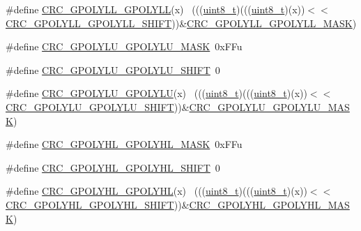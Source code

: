 \begin{DoxyCompactItemize}
\item 
\#define \hyperlink{group___c_r_c___register___masks_ga2ee0f77533aefa75692a541b5eac2a1b}{C\+R\+C\+\_\+\+G\+P\+O\+L\+Y\+L\+L\+\_\+\+G\+P\+O\+L\+Y\+LL}(x)                                  ~(((\hyperlink{_p_e___types_8h_aba7bc1797add20fe3efdf37ced1182c5}{uint8\+\_\+t})(((\hyperlink{_p_e___types_8h_aba7bc1797add20fe3efdf37ced1182c5}{uint8\+\_\+t})(x))$<$$<$\hyperlink{group___c_r_c___register___masks_ga1a323693acd9a37bb90abdc7f16ebbd8}{C\+R\+C\+\_\+\+G\+P\+O\+L\+Y\+L\+L\+\_\+\+G\+P\+O\+L\+Y\+L\+L\+\_\+\+S\+H\+I\+FT}))\&\hyperlink{group___c_r_c___register___masks_ga659c987f1e9d74e32d16e4b69bd763ee}{C\+R\+C\+\_\+\+G\+P\+O\+L\+Y\+L\+L\+\_\+\+G\+P\+O\+L\+Y\+L\+L\+\_\+\+M\+A\+SK})
\item 
\#define \hyperlink{group___c_r_c___register___masks_gaf2e9b900f7d964512e1541299729abb9}{C\+R\+C\+\_\+\+G\+P\+O\+L\+Y\+L\+U\+\_\+\+G\+P\+O\+L\+Y\+L\+U\+\_\+\+M\+A\+SK}~0x\+F\+Fu
\item 
\#define \hyperlink{group___c_r_c___register___masks_ga4d6303422fb112dfad558ee2f84aa92c}{C\+R\+C\+\_\+\+G\+P\+O\+L\+Y\+L\+U\+\_\+\+G\+P\+O\+L\+Y\+L\+U\+\_\+\+S\+H\+I\+FT}~0
\item 
\#define \hyperlink{group___c_r_c___register___masks_gae056d7d15c0caa312e768f34d89085bb}{C\+R\+C\+\_\+\+G\+P\+O\+L\+Y\+L\+U\+\_\+\+G\+P\+O\+L\+Y\+LU}(x)                                  ~(((\hyperlink{_p_e___types_8h_aba7bc1797add20fe3efdf37ced1182c5}{uint8\+\_\+t})(((\hyperlink{_p_e___types_8h_aba7bc1797add20fe3efdf37ced1182c5}{uint8\+\_\+t})(x))$<$$<$\hyperlink{group___c_r_c___register___masks_ga4d6303422fb112dfad558ee2f84aa92c}{C\+R\+C\+\_\+\+G\+P\+O\+L\+Y\+L\+U\+\_\+\+G\+P\+O\+L\+Y\+L\+U\+\_\+\+S\+H\+I\+FT}))\&\hyperlink{group___c_r_c___register___masks_gaf2e9b900f7d964512e1541299729abb9}{C\+R\+C\+\_\+\+G\+P\+O\+L\+Y\+L\+U\+\_\+\+G\+P\+O\+L\+Y\+L\+U\+\_\+\+M\+A\+SK})
\item 
\#define \hyperlink{group___c_r_c___register___masks_ga92b941ef781b6023d61bc2af7f0b1818}{C\+R\+C\+\_\+\+G\+P\+O\+L\+Y\+H\+L\+\_\+\+G\+P\+O\+L\+Y\+H\+L\+\_\+\+M\+A\+SK}~0x\+F\+Fu
\item 
\#define \hyperlink{group___c_r_c___register___masks_gaffbf0c35e87ea7a9650c9a049a08560c}{C\+R\+C\+\_\+\+G\+P\+O\+L\+Y\+H\+L\+\_\+\+G\+P\+O\+L\+Y\+H\+L\+\_\+\+S\+H\+I\+FT}~0
\item 
\#define \hyperlink{group___c_r_c___register___masks_ga21448592fbebb4f7bf7d61d9ecfa80cc}{C\+R\+C\+\_\+\+G\+P\+O\+L\+Y\+H\+L\+\_\+\+G\+P\+O\+L\+Y\+HL}(x)                                  ~(((\hyperlink{_p_e___types_8h_aba7bc1797add20fe3efdf37ced1182c5}{uint8\+\_\+t})(((\hyperlink{_p_e___types_8h_aba7bc1797add20fe3efdf37ced1182c5}{uint8\+\_\+t})(x))$<$$<$\hyperlink{group___c_r_c___register___masks_gaffbf0c35e87ea7a9650c9a049a08560c}{C\+R\+C\+\_\+\+G\+P\+O\+L\+Y\+H\+L\+\_\+\+G\+P\+O\+L\+Y\+H\+L\+\_\+\+S\+H\+I\+FT}))\&\hyperlink{group___c_r_c___register___masks_ga92b941ef781b6023d61bc2af7f0b1818}{C\+R\+C\+\_\+\+G\+P\+O\+L\+Y\+H\+L\+\_\+\+G\+P\+O\+L\+Y\+H\+L\+\_\+\+M\+A\+SK})
$$
\end{DoxyCompactItemize}
